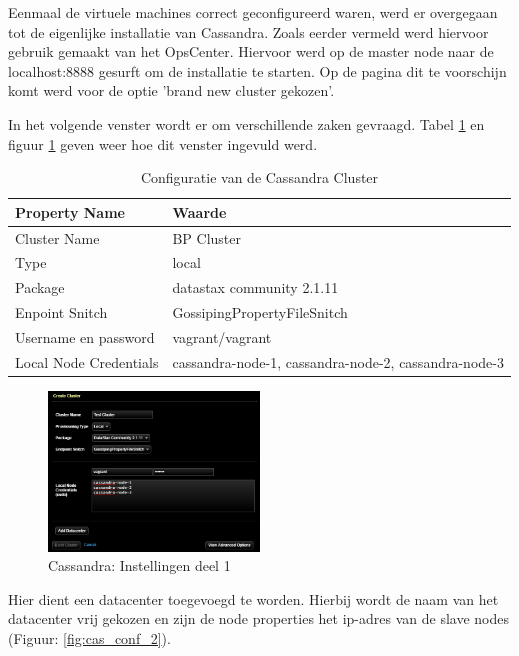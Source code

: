 Eenmaal de virtuele machines correct geconfigureerd waren, werd er overgegaan tot de eigenlijke installatie van Cassandra.
Zoals eerder vermeld werd hiervoor gebruik gemaakt van het OpsCenter.
Hiervoor werd op de master node naar de localhost:8888 gesurft om de installatie te starten. Op de pagina dit te voorschijn komt werd voor de optie 'brand new cluster gekozen'.

In het volgende venster wordt er om verschillende zaken gevraagd.
Tabel \ref{tab:cas_conf} en figuur \ref{fig:cas_conf_1} geven weer hoe dit venster ingevuld werd.

\begin{table}[H]
  \begin{tabular}{|l|l|}
  \hline
  Property Name & Waarde \\
  \hline
  \hline
  Cluster Name & BP Cluster \\
  \hline
  Type & local \\
  \hline
  Package & datastax community 2.1.11 \\
  \hline
  Enpoint Snitch & GossipingPropertyFileSnitch \\
  \hline
  Username en password & vagrant/vagrant\\
  \hline
  Local Node Credentials & cassandra-node-1, cassandra-node-2, cassandra-node-3 \\
  \hline
  \end{tabular}
  \caption{Configuratie van de Cassandra Cluster}
  \label{tab:cas_conf}
\end{table}

\begin{figure}[H]
  	\centering
    \includegraphics[width=0.5\textwidth]{img/4_installatie_cassandra/1_Configuration_part_1}
    \caption{Cassandra: Instellingen deel 1}
    \label{fig:cas_conf_1}
\end{figure}

Hier dient een datacenter toegevoegd te worden.
Hierbij wordt de naam van het datacenter vrij gekozen en zijn de node properties het ip-adres van de slave nodes (Figuur: \ref{fig:cas_conf_2}).

